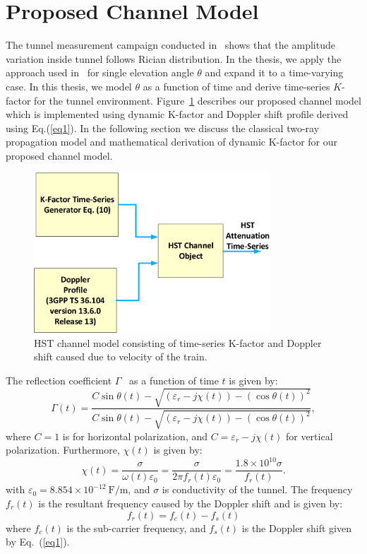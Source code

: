 \section{Proposed Channel Model}

The tunnel measurement campaign conducted in~\cite{inplter8} shows that the amplitude variation inside tunnel follows Rician distribution. In the thesis, we apply the approach used in~\cite{inlter15} for single elevation angle $\theta$ and expand it to a time-varying case. In this thesis, we model $\theta$ as a function of time and derive time-series $K$-factor for the tunnel environment. Figure~\ref{subblock} describes our proposed channel model which is implemented using dynamic K-factor and Doppler shift profile derived using Eq.(\ref{eq1}).  In the following section we discuss the classical two-ray propagation model and mathematical derivation of dynamic K-factor for our proposed channel model.

\begin{figure}[!ht]
\label{subblock}
\centering
\includegraphics[width=\textwidth,height=6cm,keepaspectratio]{images/Gill/lte_figs/subblock.eps} 
\caption{HST channel model consisting of time-series K-factor and Doppler shift caused due to velocity of the train.}
\end{figure}

The reflection coefficient $\Gamma$~\cite{booklter16} as a function of time $t$ is given by:
\begin{equation}
\Gamma(t) = \dfrac{C\sin\theta(t)-\sqrt{(\varepsilon_r-j\chi(t))-(\cos\theta(t))^2}}{C\sin\theta(t)-\sqrt{(\varepsilon_r-j\chi(t))-(\cos\theta(t))^2}},
\end{equation}
where $C = 1$ is for horizontal polarization, and $C = \varepsilon_r-j\chi(t)$ for vertical polarization. Furthermore, $\chi(t)$ is given by:
\begin{equation}
\chi(t) = \dfrac{\sigma}{\omega(t)\varepsilon_0} = \dfrac{\sigma}{2\pi f_r(t) \varepsilon_0} = \dfrac{1.8\times 10^{10}\sigma}{f_r(t)}.
\end{equation}
with $\varepsilon_0 = 8.854\times 10^{-12}~\textrm{F/m}$, and $\sigma$ is conductivity of the tunnel. The frequency $f_r(t)$ is the resultant frequency caused by the Doppler shift and is given by:
\begin{equation}
f_r(t) = f_c(t)-f_s(t)
\end{equation}
where $f_c(t)$ is the sub-carrier frequency, and $f_s(t)$ is the Doppler shift given by Eq.~(\ref{eq1}).

